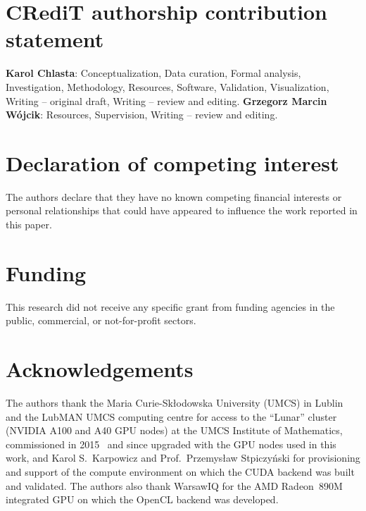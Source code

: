 \documentclass[preprint,12pt, a4paper]{elsarticle}
\begin{document}
\section*{CRediT authorship contribution statement}
\label{}

\textbf{Karol Chlasta}: Conceptualization, Data curation, Formal analysis,
Investigation, Methodology, Resources, Software, Validation, Visualization,
Writing -- original draft, Writing -- review and editing.
\textbf{Grzegorz Marcin W\'ojcik}: Resources, Supervision,
Writing -- review and editing.

\section*{Declaration of competing interest}
\label{}

The authors declare that they have no known competing financial interests or
personal relationships that could have appeared to influence the work reported
in this paper.

\section*{Funding}
\label{}

This research did not receive any specific grant from funding agencies in the
public, commercial, or not-for-profit sectors.

\section*{Acknowledgements}
\label{}

The authors thank the Maria Curie-Sk\l{}odowska University (UMCS) in Lublin and
the LubMAN UMCS computing centre for access to the ``Lunar'' cluster (NVIDIA A100
and A40 GPU nodes) at the UMCS Institute of Mathematics, commissioned in
2015~\cite{umcs_lunar2015} and since upgraded with the GPU nodes used in this
work, and Karol S.~Karpowicz and Prof.~Przemys\l{}aw Stpiczy\'nski
for provisioning and support of the compute environment on which the CUDA backend
was built and validated. The authors also thank WarsawIQ for the AMD Radeon~890M
integrated GPU on which the OpenCL backend was developed.


\end{document}
